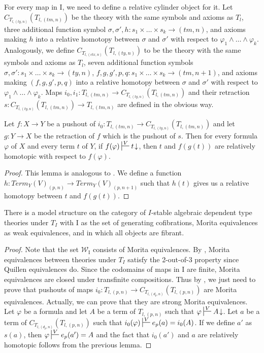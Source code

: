 \documentclass[reqno]{amsart}
\theoremstyle{definition}
\theoremstyle{remark}
\newcommand{\we}{\mathcal{W}}
\newcommand{\I}{\mathrm{I}}
\newcommand{\cyli}{i}
\numberwithin{figure}{section}
\begin{document}
For every map in $\I$, we need to define a relative cylinder object for it.
Let $C_{T_{l,(ty,n)}}(T_{l,(tm,n)})$ be the theory with the same symbols and axioms as $T_l$,
three additional function symbol $\sigma, \sigma', h : s_1 \times \ldots \times s_k \to (tm,n)$,
and axioms making $h$ into a relative homotopy between $\sigma$ and $\sigma'$ with respect to $\varphi_1 \land \ldots \land \varphi_k$.
Analogously, we define $C_{T_{l,(ctx,n)}}(T_{l,(ty,n)})$ to be the theory with the same symbols and axioms as $T_l$,
seven additional function symbols $\sigma,\sigma' : s_1 \times \ldots \times s_k \to (ty,n)$, $f,g,g',p,q : s_1 \times \ldots \times s_k \to (tm,n+1)$,
and axioms making $(f,g,g',p,q)$ into a relative homotopy between $\sigma$ and $\sigma'$ with respect to $\varphi_1 \land \ldots \land \varphi_k$.
Maps $\cyli_0,\cyli_1 : T_{l,(tm,n)} \to C_{T_{l,(ty,n)}}(T_{l,(tm,n)})$ and their retraction
$s : C_{T_{l,(ty,n)}}(T_{l,(tm,n)}) \to T_{l,(tm,n)}$ are defined in the obvious way.

\begin{lem}
Let $f : X \to Y$ be a pushout of $\cyli_0 : T_{l,(tm,n)} \to C_{T_{l,(ty,n)}}(T_{l,(tm,n)})$
and let $g : Y \to X$ be the retraction of $f$ which is the pushout of $s$.
Then for every formula $\varphi$ of $X$ and every term $t$ of $Y$,
if $f(\varphi) \sststile{}{V} t\!\downarrow$, then $t$ and $f(g(t))$ are relatively homotopic with respect to $f(\varphi)$.
\end{lem}
\begin{proof}
This lemma is analogous to \cite[Lemma~3.7]{alg-models}.
We define a function $h : Term_Y(V)_{(p,n)} \to Term_Y(V)_{(p,n+1)}$ such that $h(t)$ gives us a relative homotopy between $t$ and $f(g(t))$.
\end{proof}

\begin{thm}
There is a model structure on the category of $I$-stable algebraic dependent type theories under $T_I$
with $\I$ as the set of generating cofibrations, Morita equivalences as weak equivalences, and in which all objects are fibrant.
\end{thm}
\begin{proof}
Note that the set $\we_\I$ consists of Morita equivalences.
By , Morita equivalences between theories under $T_I$ satisfy the 2-out-of-3 property since Quillen equivalences do.
Since the codomains of maps in $\I$ are finite, Morita equivalences are closed under transfinite compositions.
Thus by , we just need to prove that pushouts of maps
$\cyli_0 : T_{l,(p,n)} \to C_{T_{l,(d_p,n)}}(T_{l,(p,n)})$ are Morita equivalences.
Actually, we can prove that they are strong Morita equivalences.
Let $\varphi$ be a formula and let $A$ be a term of $T_{l,(p,n)}$ such that $\varphi \sststile{}{V} A\!\downarrow$.
Let $a$ be a term of $C_{T_{l,(d_p,n)}}(T_{l,(p,n)})$ such that $\cyli_0(\varphi) \sststile{}{V} e_p(a) = \cyli_0(A)$.
If we define $a'$ as $s(a)$, then $\varphi \sststile{}{V} e_p(a') = A$ and the fact that $\cyli_0(a')$ and $a$ are relatively homotopic follows from the previous lemma.
\end{proof}
\end{document}
